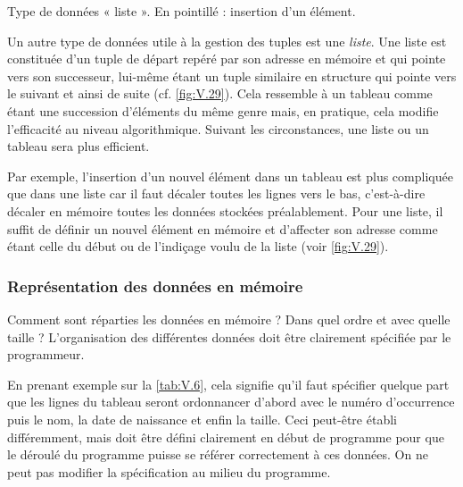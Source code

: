 \begin{marginfigure}
\caption{\label{fig:V.29}Type de données « liste ». En pointillé : insertion d'un élément.}
\end{marginfigure}

Un autre type de données utile à la gestion des tuples est une \emph{liste}. Une liste est constituée d'un tuple de départ repéré par son adresse en mémoire et qui pointe vers son successeur, lui-même étant un tuple similaire en structure qui pointe vers le suivant et ainsi de suite (cf. \cref{fig:V.29}). Cela ressemble à un tableau comme étant une succession d'éléments du même genre mais, en pratique, cela modifie l'efficacité au niveau algorithmique. Suivant les circonstances, une liste ou un tableau sera plus efficient.

Par exemple, l'insertion d'un nouvel élément dans un tableau est plus compliquée que dans une liste car il faut décaler toutes les lignes vers le bas, c'est-à-dire décaler en mémoire toutes les données stockées préalablement. Pour une liste, il suffit de définir un nouvel élément en mémoire et d'affecter son adresse comme étant celle du début ou de l'indiçage voulu de la liste (voir \cref{fig:V.29}).

\subsubsection[Représentation des données en mémoire]{Représentation des données en mémoire}
\label{subsub:V.3.2.3}

Comment sont réparties les données en mémoire ? Dans quel ordre et avec quelle taille ? 
L'organisation des différentes données doit être clairement spécifiée par le programmeur. 

En prenant exemple sur la \cref{tab:V.6}, cela signifie qu'il faut spécifier quelque part que les lignes du tableau seront ordonnancer d'abord avec le numéro d’occurrence puis le nom, la date de naissance et enfin la taille. Ceci peut-être établi différemment, mais doit être défini clairement en début de programme pour que le déroulé du programme puisse se référer correctement à ces données. On ne peut pas modifier la spécification au milieu du programme.


